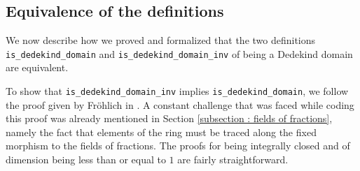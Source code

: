 \documentclass[a4paper,USenglish,cleveref, autoref, thm-restate]{lipics-v2021}
\newcommand{\lean}[1]{\texttt{#1}\xspace} %
\newcommand{\mathlib}{\textsf{mathlib}\xspace}
\begin{document}
%
%
%

\subsection{Equivalence of the definitions} \label{sec:equivalence}

We now describe how we proved and formalized that the two definitions \lean{is\_dedekind\_domain} and \lean{is\_dedekind\_domain\_inv} of being a Dedekind domain are equivalent.

To show that \lean{is\_dedekind\_domain\_inv} implies \lean{is\_dedekind\_domain}, we follow the proof given by Fr\"ohlich in \cite[Chapter 1,\S~2,~Proposition 1]{frohlich} . A constant challenge that was faced while coding this proof was already mentioned in Section \ref{subsection : fields of fractions}, namely the fact that elements of the ring must be traced along the fixed morphism to the fields of fractions.%
The proofs for being integrally closed and of dimension being less than or equal to $1$ are fairly straightforward.
\end{document}
